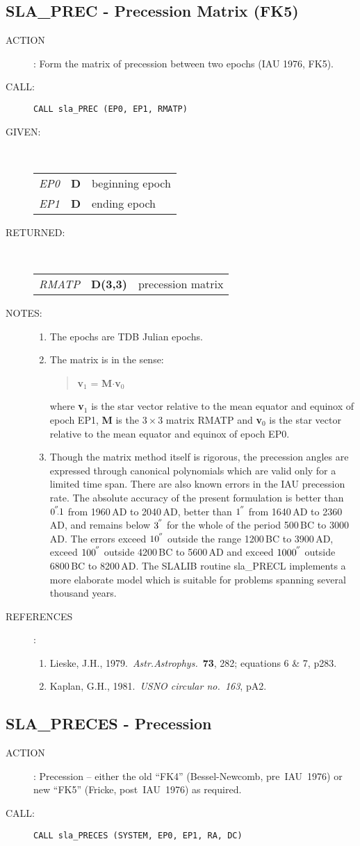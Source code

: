 \documentclass[11pt,twoside]{article}
\newcommand{\xlabel}[1]{}
\newcommand{\arcsec}[2] {\arcseci{#1}$\hspace{-0.4em}.#2$}
\newcommand{\arcsec}[2] {
      {$#1\hspace{-0.05em}^{'\hspace{-0.1em}'}\hspace{-0.4em}.#2$}
   }
\newcommand{\arcseci}[1] {$#1\hspace{-0.05em}$\raisebox{-0.5ex}
                         {$^{'\hspace{-0.1em}'}$}}
\renewcommand{\arcseci}[1] {$#1\hspace{-0.05em}^{'\hspace{-0.1em}'}$}
\newcommand{\routine}[3]
{\hbadness=10000
  \vbox
  {
    \rule{\textwidth}{0.3mm}\\
    {\Large {\bf #1} \hfill #2 \hfill {\bf #1}}\\
    \setlength{\oldspacing}{\topsep}
    \setlength{\topsep}{0.3ex}
    \begin{description}
      #3
    \end{description}
    \setlength{\topsep}{\oldspacing}
  }
}
\renewcommand{\routine}[3]
   {
      \subsection{#1\xlabel{#1} - #2\label{#1}}
       \begin{description}
         #3
       \end{description}
   }
\newcommand{\action}[1]
{\item[ACTION]: #1}
\newcommand{\action}[1]
   {\item[ACTION:] #1}
\newcommand{\call}[1]
{\item[CALL]: \hspace{0.4em}{\tt #1}}
\newlength{\oldspacing}
\renewcommand{\call}[1]
   {
    \item[CALL:] {\tt #1}
   }
\newcommand{\args}[2]
{
  \goodbreak
  \setlength{\oldspacing}{\topsep}
  \setlength{\topsep}{0.3ex}
  \begin{description}
  \item[#1]:\\[1.5ex]
    \begin{tabular}{p{7em}p{6em}p{22em}}
      #2
    \end{tabular}
  \end{description}
  \setlength{\topsep}{\oldspacing}
}
\renewcommand{\args}[2]
   {
     \begin{description}
        \item[#1:]\\
        \begin{tabular}{p{7em}p{6em}l}
           #2
        \end{tabular}
     \end{description}
   }
\newcommand{\spec}[3]
{
  {\em {#1}} & {\bf \mbox{#2}} & {#3}
}
\newcommand{\notes}[1]
{
  \goodbreak
  \setlength{\oldspacing}{\topsep}
  \setlength{\topsep}{0.3ex}
  \begin{description}
    \item[NOTES]:
        #1
  \end{description}
  \setlength{\topsep}{\oldspacing}
}
\renewcommand{\notes}[1]
   {
      \begin{description}
         \item[NOTES:]
            #1
      \end{description}
   }
\newcommand{\refs}[1]
{
  \goodbreak
  \setlength{\oldspacing}{\topsep}
  \setlength{\topsep}{0.3ex}
  \begin{description}
    \item[REFERENCES]:
        #1
  \end{description}
  \setlength{\topsep}{\oldspacing}
}
\newcommand{\refs}[1]
   {
     \begin{description}
       \item[REFERENCES:]
           #1
     \end{description}
   }
\begin{document}
\routine{SLA\_PREC}{Precession Matrix (FK5)}
{
 \action{Form the matrix of precession between two epochs (IAU 1976, FK5).}
 \call{CALL sla\_PREC (EP0, EP1, RMATP)}
}
\args{GIVEN}
{
 \spec{EP0}{D}{beginning epoch} \\
 \spec{EP1}{D}{ending epoch}
}
\args{RETURNED}
{
 \spec{RMATP}{D(3,3)}{precession matrix}
}
\notes
{
 \begin{enumerate}
  \item The epochs are TDB Julian epochs.
  \item The matrix is in the sense:
        \begin{verse}
         {\bf v}$_{1}$ =  {\bf M}$\cdot${\bf v}$_{0}$
        \end{verse}
        where {\bf v}$_{1}$ is the star vector relative to the
        mean equator and equinox of epoch EP1, {\bf M} is the
        $3\times3$ matrix RMATP and
        {\bf v}$_{0}$ is the star vector relative to the
        mean equator and equinox of epoch EP0.
  \item Though the matrix method itself is rigorous, the precession
        angles are expressed through canonical polynomials which are
        valid only for a limited time span.  There are also known
        errors in the IAU precession rate.  The absolute accuracy
        of the present formulation is better than \arcsec{0}{1} from
        1960\,AD to 2040\,AD, better than \arcseci{1} from 1640\,AD to 2360\,AD,
        and remains below \arcseci{3} for the whole of the period
        500\,BC to 3000\,AD.  The errors exceed \arcseci{10} outside the
        range 1200\,BC to 3900\,AD, exceed \arcseci{100} outside 4200\,BC to
        5600\,AD and exceed \arcseci{1000} outside 6800\,BC to 8200\,AD.
        The SLALIB routine sla\_PRECL implements a more elaborate
        model which is suitable for problems spanning several
        thousand years.
 \end{enumerate}
}
\refs
{
 \begin{enumerate}
  \item Lieske, J.H., 1979.\ {\it Astr.Astrophys.}\ {\bf 73}, 282;
        equations 6 \& 7, p283.
  \item Kaplan, G.H., 1981.\ {\it USNO circular no.\ 163}, pA2.
 \end{enumerate}
}
\routine{SLA\_PRECES}{Precession}
{
 \action{Precession -- either the old ``FK4'' (Bessel-Newcomb, pre~IAU~1976)
         or new ``FK5'' (Fricke, post~IAU~1976) as required.}
 \call{CALL sla\_PRECES (SYSTEM, EP0, EP1, RA, DC)}
}
\end{document}
